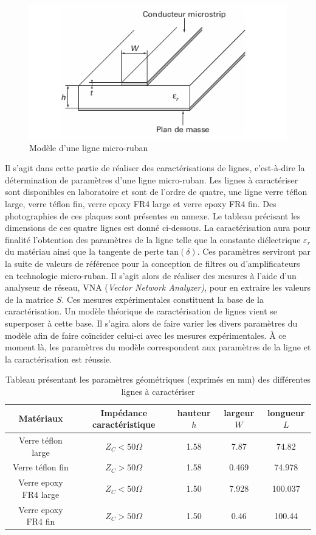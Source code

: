 \documentclass[french]{article}
\begin{document}
\begin{figure}[H]
	\centering
	\includegraphics[width=0.8\linewidth]{ressources/modele_microstrip.png}
	\caption{Modèle d'une ligne micro-ruban}
	\label{fig:modele_microstrip}
\end{figure}

Il s'agit dans cette partie de réaliser des caractérisations de lignes, c'est-à-dire la détermination de paramètres d'une ligne micro-ruban. Les lignes à caractériser sont disponibles en laboratoire et sont de l'ordre de quatre, une ligne verre téflon large, verre téflon fin, verre epoxy FR4 large et verre epoxy FR4 fin. Des photographies de ces plaques sont présentes en annexe. Le tableau précisant les dimensions de ces quatre lignes est donné ci-dessous. La caractérisation aura pour finalité l'obtention des paramètres de la ligne telle que la constante diélectrique $\varepsilon_r$ du matériau ainsi que la tangente de perte $\mbox{tan}(\delta)$. Ces paramètres serviront par la suite de valeurs de référence pour la conception de filtres ou d'amplificateurs en technologie micro-ruban. Il s'agit alors de réaliser des mesures à l'aide d'un analyseur de réseau, VNA (\textit{Vector Network Analyzer)}, pour en extraire les valeurs de la matrice $S$. Ces mesures expérimentales constituent la base de la caractérisation. Un modèle théorique de caractérisation de lignes vient se superposer à cette base. Il s'agira alors de faire varier les divers paramètres du modèle afin de faire coïncider celui-ci avec les mesures expérimentales. À ce moment là, les paramètres du modèle correspondent aux paramètres de la ligne et la caractérisation est réussie.


\begin{table}[H]
	\centering
	\begin{tabular}{|c|c|c|c|c|}
		\hline
		Matériaux & Impédance caractéristique & hauteur $h$ & largeur $W$ & longueur $L$\\
		\hline
		Verre téflon large & $Z_C < 50 \Omega$ & 1.58 & 7.87 & 74.82 \\
		\hline
		Verre téflon fin & $Z_C > 50 \Omega$ & 1.58 & 0.469 & 74.978\\
		\hline
		Verre epoxy FR4 large & $Z_C < 50 \Omega$ & 1.50 & 7.928 & 100.037\\
		\hline
		Verre epoxy FR4 fin & $Z_C > 50 \Omega$ & 1.50 & 0.46 & 100.44\\
		\hline
	\end{tabular}
	\caption{Tableau présentant les paramètres géométriques (exprimés en mm) des différentes lignes à caractériser}
	 \label{tab:geo_ligne}
\end{table}
\end{document}
